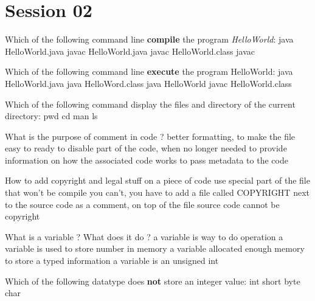 \section{Session 02}

\begin{question}{
Which of the following command line \textbf{compile} the program \textit{HelloWorld}:
}
  \false java HelloWorld.java
  \true  javac HelloWorld.java
  \false javac HelloWorld.class
  \false javac
\end{question}

\begin{question}{
Which of the following command line \textbf{execute} the program {HelloWorld}:
}
  \false java HelloWorld.java
  \false java HelloWord.class
  \true java HelloWorld
  \false javac HelloWorld.class
\end{question}

\begin{question}{
Which of the following command display the files and directory of the current directory:
}
  \false pwd
  \false cd
  \false man
  \true ls
\end{question}

\begin{question}{
What is the purpose of comment in code ?
}
  \false better formatting, to make the file easy to ready
  \false to disable part of the code, when no longer needed
  \true to provide information on how the associated code works
  \false to pass metadata to the code
\end{question}

\begin{question}{
How to add copyright and legal stuff on a piece of code
}
  \false use special part of the file that won't be compile
  \false you can't, you have to add a file called COPYRIGHT next to the source code
  \true as a comment, on top of the file
  \false source code cannot be copyright
\end{question}

\begin{question}{
What is a variable ? What does it do ?
}
  \false a variable is way to do operation
  \false a variable is used to store number in memory
  \true a variable allocated enough memory to store a typed information
  \false a variable is an unsigned int
\end{question}

\begin{question}{
Which of the following datatype does \textbf{not} store an integer value:
}
  \false int
  \false short
  \false byte
  \true char
\end{question}

